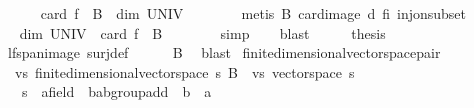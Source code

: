 \begin{isabellebody}
\ \ \ \ \isamarkupfalse%
\ {\isachardoublequoteopen}card\ {\isacharparenleft}{\kern0pt}f\ {\isacharbackquote}{\kern0pt}\ B{\isacharparenright}{\kern0pt}\ {\isacharequal}{\kern0pt}\ dim\ UNIV{\isachardoublequoteclose}\isanewline
\ \ \ \ \ \ \isamarkupfalse%
\ {\isacharparenleft}{\kern0pt}metis\ B{\isacharparenleft}{\kern0pt}{}{\isacharparenright}{\kern0pt}\ card{\isacharunderscore}{\kern0pt}image\ d\ fi\ inj{\isacharunderscore}{\kern0pt}on{\isacharunderscore}{\kern0pt}subset{\isacharparenright}{\kern0pt}\isanewline
\ \ \ \ \isamarkupfalse%
\ \isamarkupfalse%
\ {\isachardoublequoteopen}dim\ UNIV\ {\isasymle}\ card\ {\isacharparenleft}{\kern0pt}f\ {\isacharbackquote}{\kern0pt}\ B{\isacharparenright}{\kern0pt}{\isachardoublequoteclose}\isanewline
\ \ \ \ \ \ \isamarkupfalse%
\ simp\isanewline
\ \ \isamarkupfalse%
\ blast\isanewline
\ \ \isamarkupfalse%
\ \isamarkupfalse%
\ {\isacharquery}{\kern0pt}thesis\isanewline
\ \ \ \ \isamarkupfalse%
\ lf{\isachardot}{\kern0pt}span{\isacharunderscore}{\kern0pt}image\ surj{\isacharunderscore}{\kern0pt}def\isanewline
\ \ \ \ \isamarkupfalse%
\ B{\isacharparenleft}{\kern0pt}{}{\isacharparenright}{\kern0pt}\ \isamarkupfalse%
\ blast\isanewline
{}\isamarkupfalse%
%
\endisatagproof
{\isafoldproof}%
%
\isadelimproof
\isanewline
%
\endisadelimproof
\isanewline
{}\isamarkupfalse%
\isanewline
\isanewline
{}\isamarkupfalse%
\ finite{\isacharunderscore}{\kern0pt}dimensional{\isacharunderscore}{\kern0pt}vector{\isacharunderscore}{\kern0pt}space{\isacharunderscore}{\kern0pt}pair{\isacharunderscore}{\kern0pt}{}\ {\isacharequal}{\kern0pt}\isanewline
\ \ vs{}{\isacharcolon}{\kern0pt}\ finite{\isacharunderscore}{\kern0pt}dimensional{\isacharunderscore}{\kern0pt}vector{\isacharunderscore}{\kern0pt}space\ s{}\ B{}\ {\isacharplus}{\kern0pt}\ vs{}{\isacharcolon}{\kern0pt}\ vector{\isacharunderscore}{\kern0pt}space\ s{}\isanewline
\ \ \ s{}\ {\isacharcolon}{\kern0pt}{\isacharcolon}{\kern0pt}\ {\isachardoublequoteopen}{\isacharprime}{\kern0pt}a{\isacharcolon}{\kern0pt}{\isacharcolon}{\kern0pt}field\ {\isasymRightarrow}\ {\isacharprime}{\kern0pt}b{\isacharcolon}{\kern0pt}{\isacharcolon}{\kern0pt}ab{\isacharunderscore}{\kern0pt}group{\isacharunderscore}{\kern0pt}add\ {\isasymRightarrow}\ {\isacharprime}{\kern0pt}b{\isachardoublequoteclose}\ {\isacharparenleft}{\kern0pt}\ {\isachardoublequoteopen}{\isacharasterisk}{\kern0pt}a{\isachardoublequoteclose}\ {}{}{\isacharparenright}{\kern0pt}\isanewline

\end{isabellebody}
